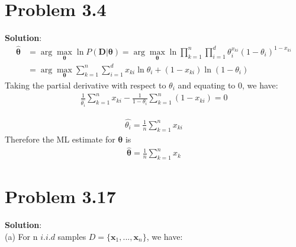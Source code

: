 \documentclass[12pt]{article}
\begin{document}
\section{Problem 3.4}
\large{\textbf{Solution}}: \\
\begin{equation*}
\begin{aligned}
\hat{\bm{\theta}} &= \arg\max_{\bm{\theta}} \ln P(\bm{D}|\bm{\theta}) =  \arg\max_{\bm{\theta}} \ln \prod^n_{k=1}\prod^d_{i=1}\theta_i^{x_{ki}}(1-\theta_i)^{1-x_{ki}}\\
&=\arg\max_{\bm{\theta}} \sum^n_{k=1}\sum^d_{i=1}x_{ki}\ln\theta_i + (1-x_{ki})\ln(1-\theta_i)
\end{aligned}
\end{equation*}
Taking the partial derivative with respect to $\theta_i$ and equating to 0, we have:
\begin{equation*}
\begin{aligned}
\frac{1}{\hat{\theta_i}}\sum_{k=1}^n x_{ki} - \frac{1}{1-\theta_i} \sum_{k=1}^n (1-x_{ki}) =0
\end{aligned}
\end{equation*}

\begin{equation*}
\begin{aligned}
\hat{\theta_i} = \frac{1}{n} \sum_{k=1}^n x_{ki}
\end{aligned}
\end{equation*}
Therefore the ML estimate for $\bm{\theta}$ is 
\begin{equation*}
\begin{aligned}
\hat{\bm{\theta}} = \frac{1}{n} \sum_{k=1}^n x_{k}
\end{aligned}
\end{equation*}

\section{Problem 3.17}
\large{\textbf{Solution}}: \\
(a) For n $i.i.d$ samples $D=\{\bm{x}_1,...,\bm{x}_n\}$, we have:
\end{document}
